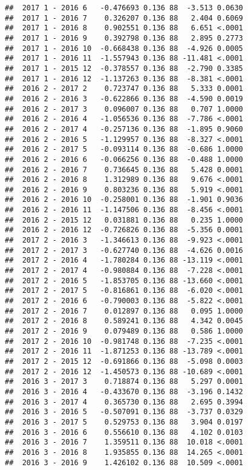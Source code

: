 \documentclass[
]{article}
\begin{document}
\begin{verbatim}
##  2017 1 - 2016 6   -0.476693 0.136 88  -3.513 0.0630 
##  2017 1 - 2016 7    0.326207 0.136 88   2.404 0.6069 
##  2017 1 - 2016 8    0.902551 0.136 88   6.651 <.0001 
##  2017 1 - 2016 9    0.392798 0.136 88   2.895 0.2773 
##  2017 1 - 2016 10  -0.668438 0.136 88  -4.926 0.0005 
##  2017 1 - 2016 11  -1.557943 0.136 88 -11.481 <.0001 
##  2017 1 - 2015 12  -0.378557 0.136 88  -2.790 0.3385 
##  2017 1 - 2016 12  -1.137263 0.136 88  -8.381 <.0001 
##  2016 2 - 2017 2    0.723747 0.136 88   5.333 0.0001 
##  2016 2 - 2016 3   -0.622866 0.136 88  -4.590 0.0019 
##  2016 2 - 2017 3    0.096007 0.136 88   0.707 1.0000 
##  2016 2 - 2016 4   -1.056536 0.136 88  -7.786 <.0001 
##  2016 2 - 2017 4   -0.257136 0.136 88  -1.895 0.9060 
##  2016 2 - 2016 5   -1.129957 0.136 88  -8.327 <.0001 
##  2016 2 - 2017 5   -0.093114 0.136 88  -0.686 1.0000 
##  2016 2 - 2016 6   -0.066256 0.136 88  -0.488 1.0000 
##  2016 2 - 2016 7    0.736645 0.136 88   5.428 0.0001 
##  2016 2 - 2016 8    1.312989 0.136 88   9.676 <.0001 
##  2016 2 - 2016 9    0.803236 0.136 88   5.919 <.0001 
##  2016 2 - 2016 10  -0.258001 0.136 88  -1.901 0.9036 
##  2016 2 - 2016 11  -1.147506 0.136 88  -8.456 <.0001 
##  2016 2 - 2015 12   0.031881 0.136 88   0.235 1.0000 
##  2016 2 - 2016 12  -0.726826 0.136 88  -5.356 0.0001 
##  2017 2 - 2016 3   -1.346613 0.136 88  -9.923 <.0001 
##  2017 2 - 2017 3   -0.627740 0.136 88  -4.626 0.0016 
##  2017 2 - 2016 4   -1.780284 0.136 88 -13.119 <.0001 
##  2017 2 - 2017 4   -0.980884 0.136 88  -7.228 <.0001 
##  2017 2 - 2016 5   -1.853705 0.136 88 -13.660 <.0001 
##  2017 2 - 2017 5   -0.816861 0.136 88  -6.020 <.0001 
##  2017 2 - 2016 6   -0.790003 0.136 88  -5.822 <.0001 
##  2017 2 - 2016 7    0.012897 0.136 88   0.095 1.0000 
##  2017 2 - 2016 8    0.589241 0.136 88   4.342 0.0045 
##  2017 2 - 2016 9    0.079489 0.136 88   0.586 1.0000 
##  2017 2 - 2016 10  -0.981748 0.136 88  -7.235 <.0001 
##  2017 2 - 2016 11  -1.871253 0.136 88 -13.789 <.0001 
##  2017 2 - 2015 12  -0.691866 0.136 88  -5.098 0.0003 
##  2017 2 - 2016 12  -1.450573 0.136 88 -10.689 <.0001 
##  2016 3 - 2017 3    0.718874 0.136 88   5.297 0.0001 
##  2016 3 - 2016 4   -0.433670 0.136 88  -3.196 0.1432 
##  2016 3 - 2017 4    0.365730 0.136 88   2.695 0.3994 
##  2016 3 - 2016 5   -0.507091 0.136 88  -3.737 0.0329 
##  2016 3 - 2017 5    0.529753 0.136 88   3.904 0.0197 
##  2016 3 - 2016 6    0.556610 0.136 88   4.102 0.0103 
##  2016 3 - 2016 7    1.359511 0.136 88  10.018 <.0001 
##  2016 3 - 2016 8    1.935855 0.136 88  14.265 <.0001 
##  2016 3 - 2016 9    1.426102 0.136 88  10.509 <.0001 

\end{verbatim}
\end{document}
